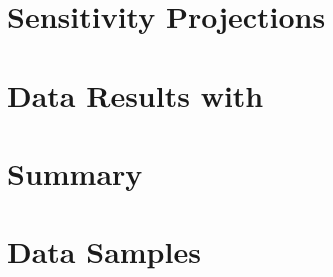 \documentclass{cmspaper}
\begin{document}
\section{Sensitivity Projections}
  

\section{Data Results with \intlumi}

\section{Summary}



\newpage 
\appendix
\appendixpage
\section{Data Samples}
  \label{app:datasets}
  
  
\end{document}
